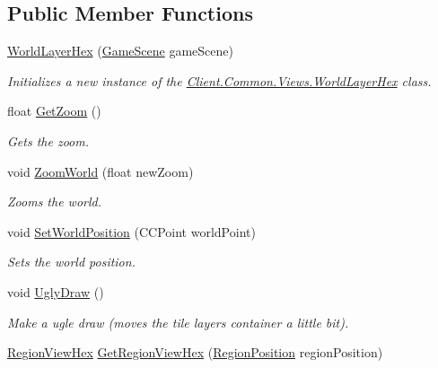 \subsection*{Public Member Functions}
\begin{DoxyCompactItemize}
\item 
\hyperlink{classClient_1_1Common_1_1Views_1_1WorldLayerHex_a748a6034c04a2dcb352f0ee616d68daf}{World\+Layer\+Hex} (\hyperlink{classClient_1_1Common_1_1Views_1_1GameScene}{Game\+Scene} game\+Scene)
\begin{DoxyCompactList}\small\item\em Initializes a new instance of the \hyperlink{classClient_1_1Common_1_1Views_1_1WorldLayerHex}{Client.\+Common.\+Views.\+World\+Layer\+Hex} class. \end{DoxyCompactList}\item 
float \hyperlink{classClient_1_1Common_1_1Views_1_1WorldLayerHex_afe55e4110f8c9fb64d57689453504ef3}{Get\+Zoom} ()
\begin{DoxyCompactList}\small\item\em Gets the zoom. \end{DoxyCompactList}\item 
void \hyperlink{classClient_1_1Common_1_1Views_1_1WorldLayerHex_a93f463bd7023fa251b2e1e982090f01f}{Zoom\+World} (float new\+Zoom)
\begin{DoxyCompactList}\small\item\em Zooms the world. \end{DoxyCompactList}\item 
void \hyperlink{classClient_1_1Common_1_1Views_1_1WorldLayerHex_aa5ce03108879cf47cca4523055576e57}{Set\+World\+Position} (C\+C\+Point world\+Point)
\begin{DoxyCompactList}\small\item\em Sets the world position. \end{DoxyCompactList}\item 
void \hyperlink{classClient_1_1Common_1_1Views_1_1WorldLayerHex_aef54028ba0071869910f2e914b0bc334}{Ugly\+Draw} ()
\begin{DoxyCompactList}\small\item\em Make a ugle draw (moves the tile layers container a little bit). \end{DoxyCompactList}\item 
\hyperlink{classClient_1_1Common_1_1Views_1_1RegionViewHex}{Region\+View\+Hex} \hyperlink{classClient_1_1Common_1_1Views_1_1WorldLayerHex_a4351c7a5f55d8c2b8dfa254d61f45ba6}{Get\+Region\+View\+Hex} (\hyperlink{classCore_1_1Models_1_1RegionPosition}{Region\+Position} region\+Position)

\end{DoxyCompactItemize}
